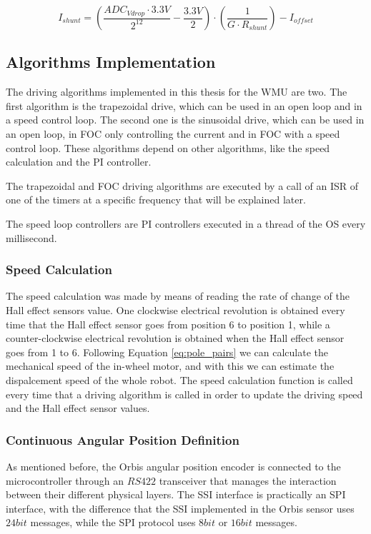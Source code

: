 \begin{equation}
	I_{shunt} = (\frac{ ADC_{Vdrop} \cdot 3.3V }{ 2^{12} } - \frac{3.3V}{2}) \cdot (\frac{1}{G \cdot R_{shunt}}) - I_{offset}
\end{equation}

\subsection{Algorithms Implementation}

The driving algorithms implemented in this thesis for the \ac{WMU} are two. The first algorithm is the trapezoidal drive, which can be used in an open loop and in a speed control loop. The second one is the sinusoidal drive, which can be used in an open loop, in \ac{FOC} only controlling the current and in \ac{FOC} with a speed control loop. These algorithms depend on other algorithms, like the speed calculation and the \ac{PI} controller. 

The trapezoidal and \ac{FOC} driving algorithms are executed by a call of an \acf{ISR} of one of the timers at a specific frequency that will be explained later. 

The speed loop controllers are \ac{PI} controllers executed in a thread of the \ac{OS} every millisecond.

\subsubsection{Speed Calculation}

The speed calculation was made by means of reading the rate of change of the Hall effect sensors value. One clockwise electrical revolution is obtained every time that the Hall effect sensor goes from position 6 to position 1, while a counter-clockwise electrical revolution is obtained when the Hall effect sensor goes from 1 to 6. Following Equation \ref{eq:pole_pairs} we can calculate the mechanical speed of the in-wheel motor, and with this we can estimate the dispalcement speed of the whole robot. The speed calculation function is called every time that a driving algorithm is called in order to update the driving speed and the Hall effect sensor values.

\subsubsection{Continuous Angular Position Definition}

As mentioned before, the Orbis angular position encoder is connected to the microcontroller through an $RS422$ transceiver that manages the interaction between their different physical layers. The \ac{SSI} interface is practically an \ac{SPI} interface, with the difference that the \ac{SSI} implemented in the Orbis sensor uses $24bit$ messages, while the \ac{SPI} protocol uses $8bit$ or $16bit$ messages.

